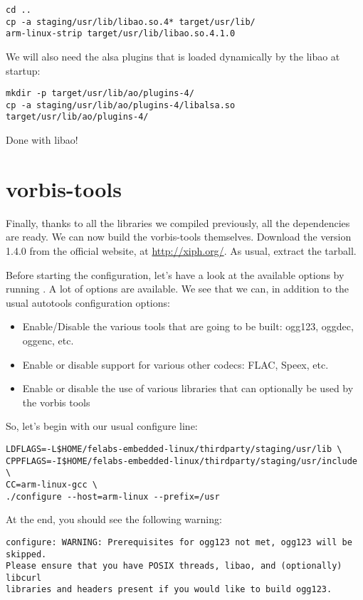 \begin{verbatim}
cd ..
cp -a staging/usr/lib/libao.so.4* target/usr/lib/
arm-linux-strip target/usr/lib/libao.so.4.1.0
\end{verbatim}

We will also need the alsa plugins that is loaded dynamically by the
libao at startup:
\begin{verbatim}
mkdir -p target/usr/lib/ao/plugins-4/
cp -a staging/usr/lib/ao/plugins-4/libalsa.so target/usr/lib/ao/plugins-4/
\end{verbatim}

Done with libao!

\section{vorbis-tools}

Finally, thanks to all the libraries we compiled previously, all the
dependencies are ready. We can now build the vorbis-tools themselves.
Download the version 1.4.0 from the official website, at
\url{http://xiph.org/}. As usual, extract the tarball.

Before starting the configuration, let's have a look at the available
options by running . A lot of options are
available. We see that we can, in addition to the usual autotools
configuration options:

\begin{itemize}
\item Enable/Disable the various tools that are going to be built:
  ogg123, oggdec, oggenc, etc.
\item Enable or disable support for various other codecs: FLAC, Speex,
  etc.
\item Enable or disable the use of various libraries that can
  optionally be used by the vorbis tools
\end{itemize}

So, let's begin with our usual configure line:

\begin{verbatim}
LDFLAGS=-L$HOME/felabs-embedded-linux/thirdparty/staging/usr/lib \
CPPFLAGS=-I$HOME/felabs-embedded-linux/thirdparty/staging/usr/include \
CC=arm-linux-gcc \
./configure --host=arm-linux --prefix=/usr
\end{verbatim}

At the end, you should see the following warning:

\begin{verbatim}
configure: WARNING: Prerequisites for ogg123 not met, ogg123 will be skipped.
Please ensure that you have POSIX threads, libao, and (optionally) libcurl
libraries and headers present if you would like to build ogg123.
\end{verbatim}

